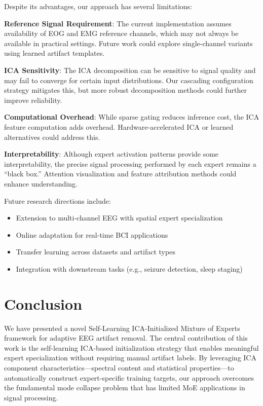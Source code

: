 \documentclass{article}
\begin{document}
Despite its advantages, our approach has several limitations:

\textbf{Reference Signal Requirement}: The current implementation assumes availability of EOG and EMG reference channels, which may not always be available in practical settings. Future work could explore single-channel variants using learned artifact templates.

\textbf{ICA Sensitivity}: The ICA decomposition can be sensitive to signal quality and may fail to converge for certain input distributions. Our cascading configuration strategy mitigates this, but more robust decomposition methods could further improve reliability.

\textbf{Computational Overhead}: While sparse gating reduces inference cost, the ICA feature computation adds overhead. Hardware-accelerated ICA or learned alternatives could address this.

\textbf{Interpretability}: Although expert activation patterns provide some interpretability, the precise signal processing performed by each expert remains a ``black box.'' Attention visualization and feature attribution methods could enhance understanding.

Future research directions include:
\begin{itemize}
\item Extension to multi-channel EEG with spatial expert specialization
\item Online adaptation for real-time BCI applications
\item Transfer learning across datasets and artifact types
\item Integration with downstream tasks (e.g., seizure detection, sleep staging)
\end{itemize}

\section{Conclusion}
\label{sec:conclusion}

We have presented a novel Self-Learning ICA-Initialized Mixture of Experts framework for adaptive EEG artifact removal. The central contribution of this work is the self-learning ICA-based initialization strategy that enables meaningful expert specialization without requiring manual artifact labels. By leveraging ICA component characteristics---spectral content and statistical properties---to automatically construct expert-specific training targets, our approach overcomes the fundamental mode collapse problem that has limited MoE applications in signal processing.
\end{document}
